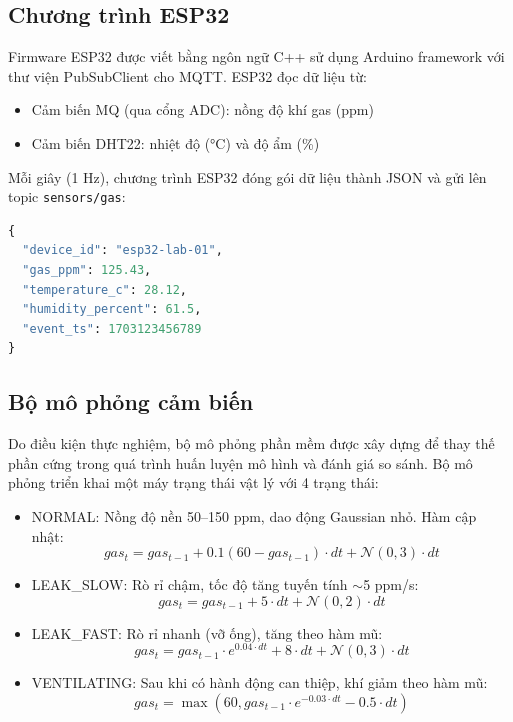 \subsection{Chương trình ESP32}

Firmware ESP32 được viết bằng ngôn ngữ C++ sử dụng Arduino framework với thư viện PubSubClient cho MQTT. ESP32 đọc dữ liệu từ:
\begin{itemize}
  \item Cảm biến MQ (qua cổng ADC): nồng độ khí gas (ppm)
  \item Cảm biến DHT22: nhiệt độ (°C) và độ ẩm (\%)
\end{itemize}

Mỗi giây (1 Hz), chương trình ESP32 đóng gói dữ liệu thành JSON và gửi lên topic \texttt{sensors/gas}:

\begin{lstlisting}[language=Python, caption={Cấu trúc payload JSON từ thiết bị}]
{
  "device_id": "esp32-lab-01",
  "gas_ppm": 125.43,
  "temperature_c": 28.12,
  "humidity_percent": 61.5,
  "event_ts": 1703123456789
}
\end{lstlisting}

\subsection{Bộ mô phỏng cảm biến}

Do điều kiện thực nghiệm, bộ mô phỏng phần mềm được xây dựng để thay thế phần cứng trong quá trình huấn luyện mô hình và đánh giá so sánh. Bộ mô phỏng triển khai một máy trạng thái vật lý với 4 trạng thái:

\begin{itemize}
  \item NORMAL: Nồng độ nền 50–150 ppm, dao động Gaussian nhỏ. Hàm cập nhật:
  \[gas_t = gas_{t-1} + 0.1(60 - gas_{t-1}) \cdot dt + \mathcal{N}(0, 3) \cdot dt\]

  \item LEAK\_SLOW: Rò rỉ chậm, tốc độ tăng tuyến tính $\sim$5 ppm/s:
  \[gas_t = gas_{t-1} + 5 \cdot dt + \mathcal{N}(0, 2) \cdot dt\]

  \item LEAK\_FAST: Rò rỉ nhanh (vỡ ống), tăng theo hàm mũ:
  \[gas_t = gas_{t-1} \cdot e^{0.04 \cdot dt} + 8 \cdot dt + \mathcal{N}(0, 3) \cdot dt\]

  \item VENTILATING: Sau khi có hành động can thiệp, khí giảm theo hàm mũ:
  \[gas_t = \max(60, gas_{t-1} \cdot e^{-0.03 \cdot dt} - 0.5 \cdot dt)\]
\end{itemize}

